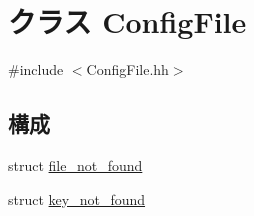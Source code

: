\hypertarget{classConfigFile}{
\section{クラス ConfigFile}
\label{classConfigFile}
}


{\ttfamily \#include $<$ConfigFile.hh$>$}\subsection*{構成}
\begin{DoxyCompactItemize}
\item 
struct \hyperlink{structConfigFile_1_1file__not__found}{file\_\-not\_\-found}
\item 
struct \hyperlink{structConfigFile_1_1key__not__found}{key\_\-not\_\-found}
\end{DoxyCompactItemize}
